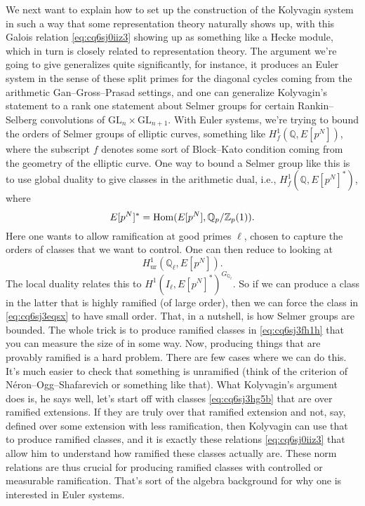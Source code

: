 \documentclass[reqno]{amsart} 
\begin{document}
We next want to explain how to set up the construction of the Kolyvagin system in such a way that some representation theory naturally shows up, with this Galois relation \eqref{eq:cq6sj0iiz3} showing up as something like a Hecke module, which in turn is closely related to representation theory.  The argument we're going to give generalizes quite significantly, for instance, it produces an Euler system in the sense of these split primes for the diagonal cycles coming from the arithmetic Gan--Gross--Prasad settings, and one can generalize Kolyvagin's statement to a rank one statement about Selmer groups for certain Rankin--Selberg convolutions of $\mathrm{GL}_n \times\mathrm{GL}_{n + 1}$.  With Euler systems, we're trying to bound the orders of Selmer groups of elliptic curves, something like $H^1_f(\mathbb{Q}, E[p^N])$, where the subscript $f$ denotes some sort of Block--Kato condition coming from the geometry of the elliptic curve.  One way to bound a Selmer group like this is to use global duality to give classes in the arithmetic dual, i.e., $H_f^1(\mathbb{Q}, E[p^N]^\ast )$, where
\begin{equation}\label{eq:cq6sj3fh1h}
  E[p^N]^\ast = \operatorname{Hom}(E[p^N], \mathbb{Q}_p / \mathbb{Z}_p(1)).
\end{equation}
Here one wants to allow ramification at good primes $\ell$, chosen to capture the orders of classes that we want to control.  One can then reduce to looking at
\begin{equation}\label{eq:cq6sj3eqsx}
  H^1_{\mathrm{ur}}(\mathbb{Q}_{\ell}, E[p^N]).
\end{equation}
The local duality relates this to $H^1(I_{\ell}, E[p^N]^\ast)^{G_{\mathbb{Q}_{\ell}}}$.  So if we can produce a class in the latter that is highly ramified (of large order), then we can force the class in \eqref{eq:cq6sj3eqsx} to have small order.  That, in a nutshell, is how Selmer groups are bounded.  The whole trick is to produce ramified classes in \eqref{eq:cq6sj3fh1h} that you can measure the size of in some way.  Now, producing things that are provably ramified is a hard problem.  There are few cases where we can do this.  It's much easier to check that something is unramified (think of the criterion of Néron--Ogg--Shafarevich or something like that).  What Kolyvagin's argument does is, he says well, let's start off with classes \eqref{eq:cq6sj3hg5b} that are over ramified extensions.  If they are truly over that ramified extension and not, say, defined over some extension with less ramification, then Kolyvagin can use that to produce ramified classes, and it is exactly these relations \eqref{eq:cq6sj0iiz3} that allow him to understand how ramified these classes actually are.  These norm relations are thus crucial for producing ramified classes with controlled or measurable ramification.  That's sort of the algebra background for why one is interested in Euler systems.
\end{document}

